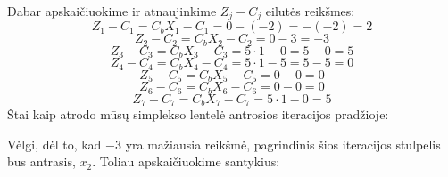 \documentclass{article}
\begin{document}
Dabar apskaičiuokime ir atnaujinkime $Z_j-C_j$ eilutės reikšmes:
\begin{equation*}
    Z_1-C_1=C_bX_1-C_1=0-(-2)=-(-2)=2
\end{equation*}
\begin{equation*}
    Z_2-C_2=C_bX_2-C_2=0-3=-3
\end{equation*}
\begin{equation*}
    Z_3-C_3=C_bX_3-C_3=5\cdot1-0=5-0=5
\end{equation*}
\begin{equation*}
    Z_4-C_4=C_bX_4-C_4=5\cdot1-5=5-5=0
\end{equation*}
\begin{equation*}
    Z_5-C_5=C_bX_5-C_5=0-0=0
\end{equation*}
\begin{equation*}
    Z_6-C_6=C_bX_6-C_6=0-0=0
\end{equation*}
\begin{equation*}
    Z_7-C_7=C_bX_7-C_7=5\cdot1-0=5
\end{equation*}
Štai kaip atrodo mūsų simplekso lentelė antrosios iteracijos pradžioje:
\begin{table}[H]
    \centering
\end{table}
Vėlgi, dėl to, kad $-3$ yra mažiausia reikšmė, pagrindinis šios iteracijos stulpelis bus antrasis, $x_2$. Toliau apskaičiuokime santykius:
\end{document}
